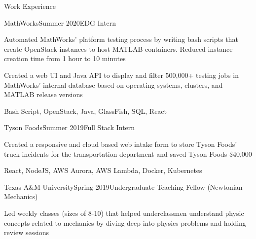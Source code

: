 \documentclass{resume} %
\begin{document}

\begin{rSection}{Work Experience}


    \begin{rSubsection}{MathWorks}{Summer 2020}{EDG Intern}{}
        \item Automated MathWorks' platform testing process by writing bash scripts that create OpenStack instances to host MATLAB containers. Reduced instance creation time from 1 hour to 10 minutes
        \item Created a web UI and Java API to display and filter 500,000+ testing jobs in MathWorks' internal database based on operating systems, clusters, and MATLAB release versions
        \item Bash Script, OpenStack, Java, GlassFish, SQL, React
    \end{rSubsection}

    \begin{rSubsection}{Tyson Foods}{Summer 2019}{Full Stack Intern}{}
        \item Created a responsive and cloud based web intake form to store Tyson Foods’ truck incidents for the transportation department and saved Tyson Foods \$40,000
        \item React, NodeJS, AWS Aurora, AWS Lambda, Docker, Kubernetes
    \end{rSubsection}

    \begin{rSubsection}{Texas A\&M University}{Spring 2019}{Undergraduate Teaching Fellow (Newtonian Mechanics)}{}
        \item Led weekly classes (sizes of 8-10) that helped underclassmen understand physic concepts related to mechanics by diving deep into physics problems and holding review sessions
    \end{rSubsection}
\end{rSection}
\end{document}
